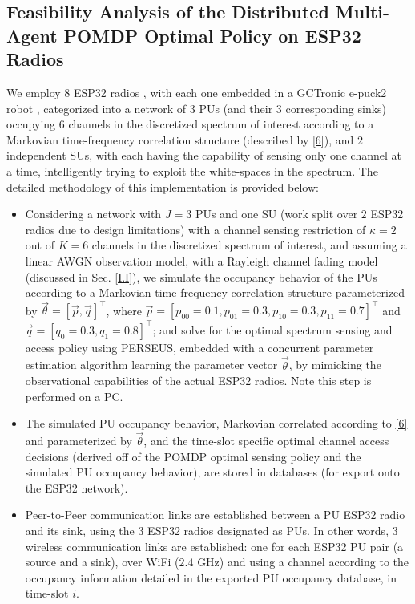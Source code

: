 \documentclass[10pt, twocolumn]{IEEEtran}
\begin{document}
\subsection{Feasibility Analysis of the Distributed Multi-Agent POMDP Optimal Policy on ESP32 Radios}\label{D}
We employ $8$ ESP32 radios \cite{Espressif:ESP32}, with each one embedded in a GCTronic e-puck2 robot \cite{GCTronic:epuck2}, categorized into a network of $3$ PUs (and their $3$ corresponding sinks) occupying $6$ channels in the discretized spectrum of interest according to a Markovian time-frequency correlation structure (described by \eqref{6}), and $2$ independent SUs, with each having the capability of sensing only one channel at a time, intelligently trying to exploit the white-spaces in the spectrum. The detailed methodology of this implementation is provided below:
\begin{itemize}
    \item Considering a network with $J{=}3$ PUs and one SU (work split over $2$ ESP32 radios due to design limitations) with a channel sensing restriction of $\kappa{=}2$ out of $K{=}6$ channels in the discretized spectrum of interest, and assuming a linear AWGN observation model, with a Rayleigh channel fading model (discussed in Sec. \ref{I.I}), we simulate the occupancy behavior of the PUs according to a Markovian time-frequency correlation structure parameterized by $\vec{\theta}{=}[\vec{p},\vec{q}]^{\intercal}$, where $\vec{p}{=}[p_{00}{=}0.1,p_{01}{=}0.3,p_{10}{=}0.3,p_{11}{=}0.7]^{\intercal}$
     and $\vec{q}{=}[q_{0}{=}0.3,q_{1}{=}0.8]^{\intercal}$; and solve for the optimal spectrum sensing and access policy using PERSEUS, embedded with a concurrent parameter estimation algorithm learning the parameter vector $\vec{\theta}$, by mimicking the observational capabilities of the actual ESP32 radios. Note this step is performed on a PC.
    \item The simulated PU occupancy behavior, Markovian correlated according to \eqref{6} and parameterized by $\vec{\theta}$, and the time-slot specific optimal channel access decisions (derived off of the POMDP optimal sensing policy and the simulated PU occupancy behavior), are stored in databases (for export onto the ESP32 network).
    \item Peer-to-Peer communication links are established between a PU ESP32 radio and its sink, using the $3$ ESP32 radios designated as PUs. In other words, $3$ wireless communication links are established: one for each ESP32 PU pair (a source and a sink), over WiFi ($2.4$ GHz) and using a channel according to the occupancy information detailed in the exported PU occupancy database, in time-slot $i$.

\end{itemize}
\end{document}
